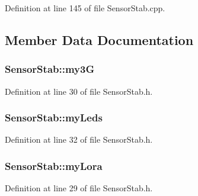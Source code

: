 Definition at line 145 of file Sensor\+Stab.\+cpp.



\subsection{Member Data Documentation}
\subsubsection[{\texorpdfstring{my3G}{my3G}}]{ Sensor\+Stab\+::my3G\hspace{0.3cm}{\ttfamily [private]}}\hypertarget{class_sensor_stab_a6f4f4186b2a8aa2f80e626bbdd181ad1}{}\label{class_sensor_stab_a6f4f4186b2a8aa2f80e626bbdd181ad1}


Definition at line 30 of file Sensor\+Stab.\+h.

\subsubsection[{\texorpdfstring{my\+Leds}{myLeds}}]{ Sensor\+Stab\+::my\+Leds\hspace{0.3cm}{\ttfamily [private]}}\hypertarget{class_sensor_stab_a039887cb4d0ae1f2358318686ffd6deb}{}\label{class_sensor_stab_a039887cb4d0ae1f2358318686ffd6deb}


Definition at line 32 of file Sensor\+Stab.\+h.

\subsubsection[{\texorpdfstring{my\+Lora}{myLora}}]{ Sensor\+Stab\+::my\+Lora\hspace{0.3cm}{\ttfamily [private]}}\hypertarget{class_sensor_stab_a512a8b4918901f8326475caf6ed9ed7b}{}\label{class_sensor_stab_a512a8b4918901f8326475caf6ed9ed7b}


Definition at line 29 of file Sensor\+Stab.\+h.

